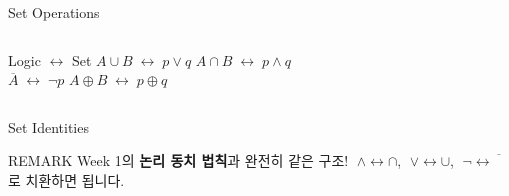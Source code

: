 \documentclass{beamer}
\begin{document}
\begin{frame}[t,shrink=5]{Set Operations}
\begin{columns}[T]
        \vspace{0.1cm}
        \begin{block}{\scriptsize Logic $\leftrightarrow$ Set}
            \scriptsize
            $A \cup B \;\leftrightarrow\; p \lor q$ \qquad
            $A \cap B \;\leftrightarrow\; p \land q$\\
            $\overline{A} \;\leftrightarrow\; \neg p$ \qquad\quad
            $A \oplus B \;\leftrightarrow\; p \oplus q$
        \end{block}
    \end{columns}
\end{frame}

\begin{frame}[t,shrink=8]{Set Identities}
    \small
    \vspace{0.05cm}
    \begin{alertblock}{REMARK}
        \scriptsize Week 1의 \textbf{논리 동치 법칙}과 완전히 같은 구조! $\;\land \leftrightarrow \cap$, $\;\lor \leftrightarrow \cup$, $\;\neg \leftrightarrow \overline{\phantom{A}}$ 로 치환하면 됩니다.
    \end{alertblock}


\end{frame}
\end{document}

